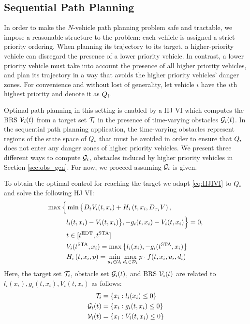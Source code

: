 \subsection{Sequential Path Planning}
In order to make the $N$-vehicle path planning problem safe and tractable, we impose a reasonable structure to the problem: each vehicle is assigned a strict priority ordering. When planning its trajectory to its target, a higher-priority vehicle can disregard the presence of a lower priority vehicle. In contrast, a lower priority vehicle must take into account the presence of all higher priority vehicles, and plan its trajectory in a way that avoids the higher priority vehicles' danger zones. For convenience and without lost of generality, let vehicle $i$ have the $i$th highest priority and denote it as $Q_i$.

Optimal path planning in this setting is enabled by a HJ VI which computes the BRS $\mathcal{V}_i(t)$ from a target set $\mathcal{T}_i$ in the presence of time-varying obstacles $\mathcal{G}_i(t)$. In the sequential path planning application, the time-varying obstacles represent regions of the state space of $Q_i$ that must be avoided in order to ensure that $Q_i$ does not enter any danger zones of higher priority vehicles. We present three different ways to compute $\mathcal{G}_i$, obstacles induced by higher priority vehicles in Section \ref{sec:obs_gen}. For now, we proceed assuming $\mathcal{G}_i$ is given.

To obtain the optimal control for reaching the target we adapt \eqref{eq:HJIVI} to $Q_i$ and solve the following HJ VI:
%
\begin{equation}
\label{eq:HJIVI_i}
\begin{aligned}
\max\Big\{&\min\big\{D_t V_i(t, x_i) + H_i\left(t, x_i, D_{x_i} V\right),\\
& l_i(t, x_i) - V_i(t, x_i)\big\}, -g_i(t, x_i) - V_i(t, x_i)\Big\} = 0, \\
& t \in [t^\text{EDT}, t^\text{STA}]\\
&V_i(t^\text{STA}, x_i) = \max\big\{l_i(x_i), -g_i(t^\text{STA}, x_i)\big\} \\
&H_i\left(t, x_i, p\right) = \min_{u_i \in \mathcal{U}_i} \max_{d_i \in \mathcal{D}_i} p \cdot f(t, x_i, u_i, d_i)
\end{aligned}
\end{equation}
Here, the target set $\mathcal{T}_i$, obstacle set $\mathcal{G}_i(t)$, and BRS $\mathcal{V}_i(t)$ are related to $l_i(x_i), g_i(t, x_i), V_i(t, x_i)$ as follows:
%
\begin{equation}
\begin{aligned}
\mathcal{T}_i &= \{x_i: l_i(x_i) \le 0\} \\
\mathcal{G}_i(t) &= \{x_i: g_i(t, x_i) \le 0\} \\
\mathcal{V}_i(t) &= \{x_i: V_i(t, x_i) \le 0\}
\end{aligned}
\end{equation}

